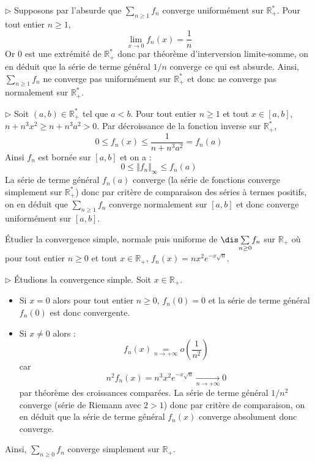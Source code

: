 \documentclass[a4paper,10pt]{report}
\newcommand{\Sum}[2]{\ensuremath{\textstyle{\sum\limits_{#1}^{#2}}}}
\begin{document}
\medskip

\noindent $\rhd$ Supposons par l'absurde que $\Sum{n\geq 1}{} f_n$ converge uniformément sur $\mathbb{R}_+^*$. Pour tout entier $n \geq 1$,
$$ \lim_{x \rightarrow 0} f_n(x) = \dfrac{1}{n}$$
Or $0$ est une extrémité de $\mathbb{R}_+^*$ donc par théorème d'interversion limite-somme, on en déduit que la série de terme général $1/n$ converge ce qui est absurde. Ainsi, $\Sum{n\geq 1}{} f_n$ ne converge pas uniformément sur $\mathbb{R}_+^*$ et donc ne converge pas normalement sur $\mathbb{R}_+^*$.

\medskip

\noindent $\rhd$ Soit $(a,b) \in \mathbb{R}_+^*$ tel que $a<b$. Pour tout entier $n \geq 1$ et tout $x \in [a,b]$, $n+n^3x^2 \geq n+n^3a^2 >0$. Par décroissance de la fonction inverse sur $\mathbb{R}_+^*$,
$$ 0 \leq f_n(x) \leq \dfrac{1}{n+n^3a^2} = f_n(a)$$
Ainsi $f_n$ est bornée sur $[a,b]$ et on a :
$$ 0 \leq \Vert f_n \Vert_{\infty} \leq f_n(a)$$
La série de terme général $f_n(a)$ converge (la série de fonctions converge simplement sur $\mathbb{R}_+^*$) donc par critère de comparaison des séries à termes positifs, on en déduit que $\Sum{n\geq 1}{} f_n$ converge normalement sur $[a,b]$ et donc converge uniformément sur $[a,b]$.

\medskip


\begin{Exercice}{}\label{doublon} Étudier la convergence simple, normale puis uniforme de $\dis \Sum{n\geq 0}{} f_n$ sur $\mathbb{R}_+$ où pour tout entier $n \geq 0$ et tout $x \in \mathbb{R}_+$, $f_n(x) = nx^2e^{-x\sqrt{n}}.$
\end{Exercice}

\corr 

\noindent $\rhd$ Étudions la convergence simple. Soit $x \in \mathbb{R}_+$.

\begin{itemize}
\item Si $x=0$ alors pour tout entier $n \geq 0$, $f_n(0)=0$ et la série de terme général $f_n(0)$ est donc convergente.
\item Si $x \neq 0$ alors :
$$ f_n(x) \underset{n \rightarrow + \infty}{=} o \left( \dfrac{1}{n^2} \right)$$
car 
$$ n^2f_n(x) = n^3x^2e^{-x\sqrt{n}} \underset{n \rightarrow + \infty}{\longrightarrow} 0$$
par théorème des croissances comparées. La série de terme général $1/n^2$ converge (série de Riemann avec $2>1$) donc par critère de comparaison, on en déduit que la série de terme général $f_n(x)$ converge absolument donc converge.
\end{itemize}
Ainsi, $\Sum{n\geq 0}{} f_n$ converge simplement sur $\mathbb{R}_+$.
\end{document}
